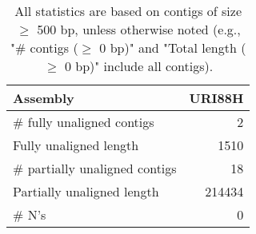 \documentclass[12pt,a4paper]{article}
\begin{document}
\begin{table}[ht]
\begin{center}
\caption{All statistics are based on contigs of size $\geq$ 500 bp, unless otherwise noted (e.g., "\# contigs ($\geq$ 0 bp)" and "Total length ($\geq$ 0 bp)" include all contigs).}
\begin{tabular}{|l*{1}{|r}|}
\hline
Assembly & URI88H \\ \hline
\# fully unaligned contigs & 2 \\ \hline
Fully unaligned length & 1510 \\ \hline
\# partially unaligned contigs & 18 \\ \hline
Partially unaligned length & 214434 \\ \hline
\# N's & 0 \\ \hline
\end{tabular}
\end{center}
\end{table}
\end{document}
